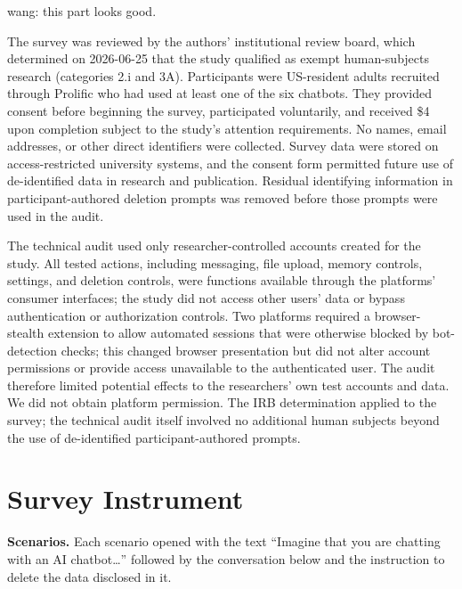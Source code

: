 \documentclass[conference,compsoc]{IEEEtran}
\newcommand{\xw}[1] {{\color{red}wang: #1}}
\begin{document}
\xw{this part looks good.}

The survey was reviewed by the authors' institutional review board, which determined on 2026-06-25 that the study qualified as exempt human-subjects research (categories 2.i and 3A). Participants were US-resident adults recruited through Prolific who had used at least one of the six chatbots. They provided consent before beginning the survey, participated voluntarily, and received \$4 upon completion subject to the study's attention requirements. No names, email addresses, or other direct identifiers were collected. Survey data were stored on access-restricted university systems, and the consent form permitted future use of de-identified data in research and publication. Residual identifying information in participant-authored deletion prompts was removed before those prompts were used in the audit.

The technical audit used only researcher-controlled accounts created for the study. All tested actions, including messaging, file upload, memory controls, settings, and deletion controls, were functions available through the platforms' consumer interfaces; the study did not access other users' data or bypass authentication or authorization controls. Two platforms required a browser-stealth extension to allow automated sessions that were otherwise blocked by bot-detection checks; this changed browser presentation but did not alter account permissions or provide access unavailable to the authenticated user. The audit therefore limited potential effects to the researchers' own test accounts and data. We did not obtain platform permission. The IRB determination applied to the survey; the technical audit itself involved no additional human subjects beyond the use of de-identified participant-authored prompts.

\appendix

\section{Survey Instrument}
\label{sec:instrument}

\textbf{Scenarios.} Each scenario opened with the text ``Imagine that you
are chatting with an AI chatbot\ldots'' followed by the conversation
below and the instruction to delete the data disclosed in it.
\end{document}
